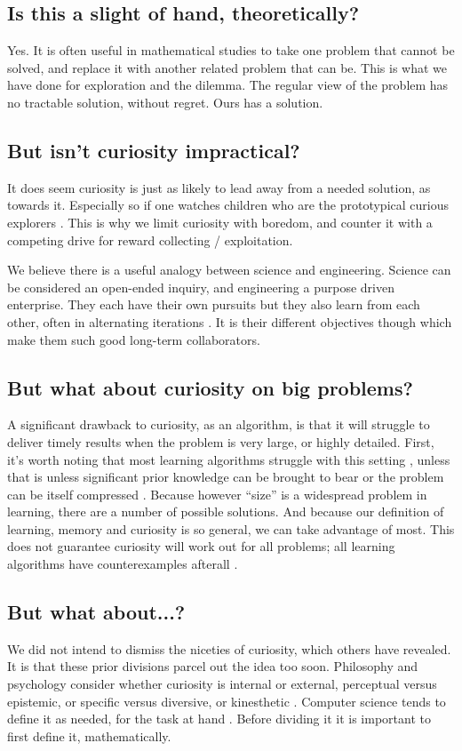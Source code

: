 \subsection*{Is this a slight of hand, theoretically?}
Yes. It is often useful in mathematical studies to take one problem that cannot be solved, and replace it with another related problem that can be. This is what we have done for exploration and the dilemma. The regular view of the problem has no tractable solution, without regret. Ours has a solution.


\subsection*{But isn't curiosity impractical?}
It does seem curiosity is just as likely to lead away from a needed solution, as towards it. Especially so if one watches children who are the prototypical curious explorers \cite{Sumner2019,Kidd2015}. This is why we limit curiosity with boredom, and counter it with a competing drive for reward collecting / exploitation. 

We believe there is a useful analogy between science and engineering. Science can be considered an open-ended inquiry, and engineering a purpose driven enterprise. They each have their own pursuits but they also learn from each other, often in alternating iterations \cite{Gupta2006}. It is their different objectives though which make them such good long-term collaborators.


\subsection*{But what about curiosity on big problems?}
A significant drawback to curiosity, as an algorithm, is that it will struggle to deliver timely results when the problem is very large, or highly detailed. First, it's worth noting that most learning algorithms struggle with this setting \cite{MacKay2003,Sutton2018}, unless that is unless significant prior knowledge can be brought to bear \cite{Zhang2020,Sutton2018} or the problem can be itself compressed \cite{Ha2018a,Fister2019}. Because however ``size'' is a widespread problem in learning, there are a number of possible solutions. And because our definition of learning, memory and curiosity is so general, we can take advantage of most. This does not guarantee curiosity will work out for all problems; all learning algorithms have counterexamples afterall \cite{Wolpert1997}.


\subsection*{But what about...?}
We did not intend to dismiss the niceties of curiosity, which others have revealed. It is that these prior divisions parcel out the idea too soon. Philosophy and psychology consider whether curiosity is internal or external, perceptual versus epistemic, or specific versus diversive, or kinesthetic \cite{Kidd2015,Berlyne1950,Zhou2020}. Computer science tends to define it as needed, for the task at hand \cite{Stanley2004,Friston2016,Lehman2011a,Lehman2013,Mouret2015,Colas2020}. Before dividing it it is important to first define it, mathematically. 


